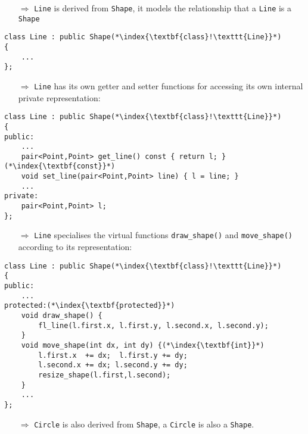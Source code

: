 \documentclass[10pt]{article}
\begin{document}
\begin{enumerate}
\item[$\Rightarrow$] \texttt{Line} is derived from \texttt{Shape}, it models the relationship that a \texttt{Line} is a \texttt{Shape}
\end{enumerate}
\begin{lstlisting}
class Line : public Shape(*\index{\textbf{class}!\texttt{Line}}*)
{
    ...
};
\end{lstlisting}
\begin{enumerate}
\item[$\Rightarrow$] \texttt{Line} has its own getter and setter functions for accessing its own internal private representation:
\end{enumerate}
\begin{lstlisting}
class Line : public Shape(*\index{\textbf{class}!\texttt{Line}}*)
{
public:
    ...
    pair<Point,Point> get_line() const { return l; }(*\index{\textbf{const}}*)
    void set_line(pair<Point,Point> line) { l = line; }
    ...
private:
    pair<Point,Point> l;
};
\end{lstlisting}
\begin{enumerate}
\item[$\Rightarrow$] \texttt{Line} specialises the virtual functions \texttt{draw\_shape()} and \texttt{move\_shape()} according to its representation:
\end{enumerate}
\begin{lstlisting}
class Line : public Shape(*\index{\textbf{class}!\texttt{Line}}*)
{
public:
    ...
protected:(*\index{\textbf{protected}}*)
    void draw_shape() {
        fl_line(l.first.x, l.first.y, l.second.x, l.second.y);
    }
    void move_shape(int dx, int dy) {(*\index{\textbf{int}}*)
        l.first.x  += dx;  l.first.y += dy;
        l.second.x += dx; l.second.y += dy;
        resize_shape(l.first,l.second);
    }
    ...
};
\end{lstlisting}
\begin{enumerate}
\item[$\Rightarrow$] \texttt{Circle} is also derived from \texttt{Shape}, a \texttt{Circle} is also a \texttt{Shape}.
\end{enumerate}
\end{document}
